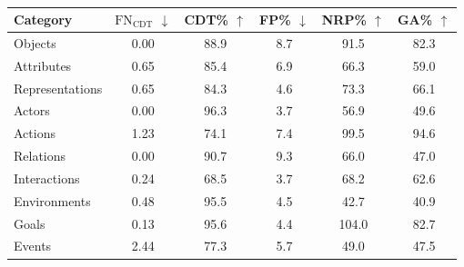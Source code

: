 \begin{table}[htbp]
\centering
\footnotesize
\begin{tabular}{l c c c c c}
\toprule
\textbf{Category} & $\text{FN}_\text{CDT}$ $\downarrow$ & CDT\% $\uparrow$ & FP\% $\downarrow$ & NRP\% $\uparrow$ & GA\% $\uparrow$ \\
\midrule
Objects        & 0.00 & 88.9 & 8.7 & 91.5 & 82.3 \\
Attributes     & 0.65 & 85.4 & 6.9 & 66.3 & 59.0 \\
Representations & 0.65 & 84.3 & 4.6 & 73.3 & 66.1 \\
Actors         & 0.00 & 96.3 & 3.7 & 56.9 & 49.6 \\
Actions        & 1.23 & 74.1 & 7.4 & 99.5 & 94.6 \\
Relations      & 0.00 & 90.7 & 9.3 & 66.0 & 47.0 \\
Interactions   & 0.24 & 68.5 & 3.7 & 68.2 & 62.6 \\
Environments   & 0.48 & 95.5 & 4.5 & 42.7 & 40.9 \\
Goals          & 0.13 & 95.6 & 4.4 & 104.0 & 82.7 \\
Events         & 2.44 & 77.3 & 5.7 & 49.0 & 47.5 \\
\bottomrule
\end{tabular}
\caption{}
\label{tab:agent_model_metrics}
\end{table}
